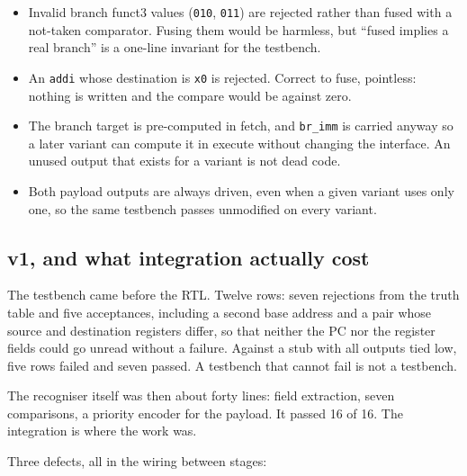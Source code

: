 \documentclass[11pt]{article}
\begin{document}
\begin{itemize}
\item Invalid branch funct3 values (\texttt{010}, \texttt{011}) are rejected rather than fused
  with a not-taken comparator. Fusing them would be harmless, but ``fused implies a real
  branch'' is a one-line invariant for the testbench.
\item An \texttt{addi} whose destination is \texttt{x0} is rejected. Correct to fuse, pointless:
  nothing is written and the compare would be against zero.
\item The branch target is pre-computed in fetch, and \texttt{br\_imm} is carried anyway so a
  later variant can compute it in execute without changing the interface. An unused output that
  exists for a variant is not dead code.
\item Both payload outputs are always driven, even when a given variant uses only one, so the
  same testbench passes unmodified on every variant.
\end{itemize}

\subsection{v1, and what integration actually cost}

The testbench came before the RTL. Twelve rows: seven rejections from the truth table and five
acceptances, including a second base address and a pair whose source and destination registers
differ, so that neither the PC nor the register fields could go unread without a failure.
Against a stub with all outputs tied low, five rows failed and seven passed. A testbench that
cannot fail is not a testbench.

The recogniser itself was then about forty lines: field extraction, seven comparisons, a
priority encoder for the payload. It passed 16 of 16. The integration is where the work was.

Three defects, all in the wiring between stages:
\end{document}
